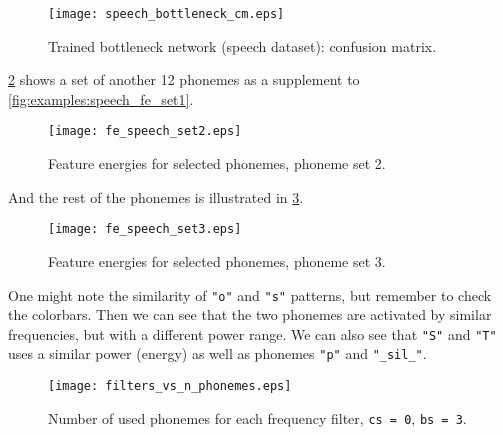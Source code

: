 \begin{figure}[H]
\centering
\texttt{[image: speech\_bottleneck\_cm.eps]}
\caption{Trained bottleneck network (speech dataset): confusion matrix.}
\label{fig:app:speech_bottleneck_cm}
\end{figure}

\cref{fig:app:speech_fe_set2} shows a set of another 12 phonemes as a supplement to \cref{fig:examples:speech_fe_set1}.
\begin{figure}[H]
\centering
\texttt{[image: fe\_speech\_set2.eps]}
\caption{Feature energies for selected phonemes, phoneme set 2.}
\label{fig:app:speech_fe_set2}
\end{figure}

And the rest of the phonemes is illustrated in \cref{fig:app:speech_fe_set3}.

\begin{figure}[H]
\centering
\texttt{[image: fe\_speech\_set3.eps]}
\caption{Feature energies for selected phonemes, phoneme set 3.}
\label{fig:app:speech_fe_set3}
\end{figure}

One might note the similarity of \texttt{"o"} and \texttt{"s"} patterns, but remember to check the colorbars. Then we can see that the two phonemes are activated by similar frequencies, but with a different power range. We can also see that \texttt{"S"} and \texttt{"T"} uses a similar power (energy) as well as phonemes \texttt{"p"} and \texttt{"\_sil\_"}.

\begin{figure}[H]
\centering
\texttt{[image: filters\_vs\_n\_phonemes.eps]}
\caption{Number of used phonemes for each frequency filter, \texttt{cs = 0}, \texttt{bs = 3}.}
\label{fig:app:filters_vs_n_phonemes}
\end{figure}